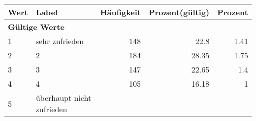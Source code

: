     \begin{longtable}{lXrrr}
     \toprule
     \textbf{Wert} & \textbf{Label} & \textbf{Häufigkeit} & \textbf{Prozent(gültig)} & \textbf{Prozent} \\
     \endhead
     \midrule
     \multicolumn{5}{l}{\textbf{Gültige Werte}}\\

     1 &
     \multicolumn{1}{X}{ sehr zufrieden   } &


       \num{148} &
       \num[round-mode=places,round-precision=2]{22.8} &
         \num[round-mode=places,round-precision=2]{1.41} \\

     2 &
     \multicolumn{1}{X}{ 2   } &


       \num{184} &
       \num[round-mode=places,round-precision=2]{28.35} &
         \num[round-mode=places,round-precision=2]{1.75} \\

     3 &
     \multicolumn{1}{X}{ 3   } &


       \num{147} &
       \num[round-mode=places,round-precision=2]{22.65} &
         \num[round-mode=places,round-precision=2]{1.4} \\

     4 &
     \multicolumn{1}{X}{ 4   } &


       \num{105} &
       \num[round-mode=places,round-precision=2]{16.18} &
         \num[round-mode=places,round-precision=2]{1} \\

     5 &
     \multicolumn{1}{X}{ überhaupt nicht zufrieden   } &



\end{longtable}
